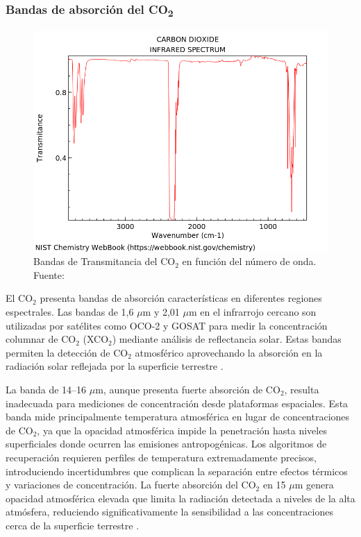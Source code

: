 \subsubsection{Bandas de absorción del CO\textsubscript{2}}

\begin{figure}[H]
    \centering
    \includegraphics[width=1\textwidth]{3.Conceptos_Previos/cbook.cgi-2.png}
    \caption{Bandas de Transmitancia del CO$_2$ en función del número de onda.\\Fuente: \cite{nist2025co2_spectrum} }
    \label{fig:co2trans}
\end{figure}

El CO$_2$ presenta bandas de absorción características en diferentes regiones espectrales. Las bandas de 1,6 $\mu$m y 2,01 $\mu$m en el infrarrojo cercano son utilizadas por satélites como OCO-2 y GOSAT para medir la concentración columnar de CO$_2$ (XCO$_2$) mediante análisis de reflectancia solar. Estas bandas permiten la detección de CO$_2$ atmosférico aprovechando la absorción en la radiación solar reflejada por la superficie terrestre \cite{oco2_technical_specs_2024}.


La banda de 14--16 $\mu$m, aunque presenta fuerte absorción de CO$_2$, resulta inadecuada para mediciones de concentración desde plataformas espaciales. Esta banda mide principalmente temperatura atmosférica en lugar de concentraciones de CO$_2$, ya que la opacidad atmosférica impide la penetración hasta niveles superficiales donde ocurren las emisiones antropogénicas. Los algoritmos de recuperación requieren perfiles de temperatura extremadamente precisos, introduciendo incertidumbres que complican la separación entre efectos térmicos y variaciones de concentración. La fuerte absorción del CO$_2$ en 15 $\mu$m genera opacidad atmosférica elevada que limita la radiación detectada a niveles de la alta atmósfera, reduciendo significativamente la sensibilidad a las concentraciones cerca de la superficie terrestre \cite{pmc_co2_absorption_2018}.



